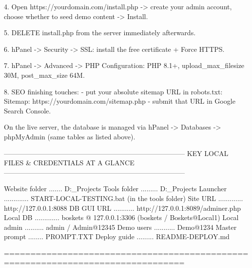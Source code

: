   4. Open  https://yourdomain.com/install.php  -> create your admin account,
     choose whether to seed demo content -> Install.

  5. DELETE install.php from the server immediately afterwards.

  6. hPanel -> Security -> SSL: install the free certificate + Force HTTPS.

  7. hPanel -> Advanced -> PHP Configuration: PHP 8.1+,
     upload_max_filesize 30M, post_max_size 64M.

  8. SEO finishing touches:
     - put your absolute sitemap URL in robots.txt:
         Sitemap: https://yourdomain.com/sitemap.php
     - submit that URL in Google Search Console.

  On the live server, the database is managed via
  hPanel -> Databases -> phpMyAdmin (same tables as listed above).


--------------------------------------------------------------------------------
 KEY LOCAL FILES & CREDENTIALS AT A GLANCE
--------------------------------------------------------------------------------

  Website folder ....... D:\Ketul\Claude_Projects\BosketsAlimentosWebSite
  Tools folder ......... D:\Ketul\Claude_Projects\BosketsAlimentosTools
  Launcher ............. START-LOCAL-TESTING.bat   (in the tools folder)
  Site URL ............. http://127.0.0.1:8088
  DB GUI URL ........... http://127.0.0.1:8089/adminer.php
  Local DB ............. boskets @ 127.0.0.1:3306  (boskets / Boskets@Local1)
  Local admin .......... admin / Admin@12345
  Demo users ........... Demo@1234
  Master prompt ........ PROMPT.TXT
  Deploy guide ......... README-DEPLOY.md

================================================================================
